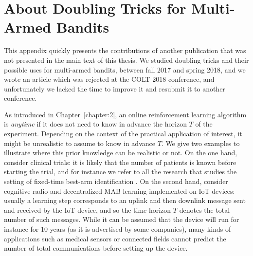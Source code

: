 \chapter{About Doubling Tricks for Multi-Armed Bandits}
\label{app:2:DoublingTricks}

This appendix quickly presents the contributions of another publication that was not presented in the main text of this thesis.
We studied doubling tricks and their possible uses for multi-armed bandits, between fall 2017 and spring 2018, and we wrote an article \cite{Besson2018DoublingTricks} which was rejected at the COLT 2018 conference, and unfortunately we lacked the time to improve it and resubmit it to another conference.




As introduced in Chapter~\ref{chapter:2},
an online reinforcement learning algorithm is \emph{anytime} if it does not need to know in advance the horizon $T$ of the experiment.
%
Depending on the context of the practical application of interest, it might be unrealistic to assume to know in advance $T$. We give two examples to illustrate where this prior knowledge can be realistic or not.
On the one hand, consider clinical trials: it is likely that the number of patients is known before starting the trial, and for instance we refer to all the research that studies the setting of fixed-time best-arm identification \cite{audibert2010best,Garivier16BAI}.
On the second hand, consider cognitive radio and decentralized MAB learning implemented on IoT devices: usually a learning step corresponds to an uplink and then downlink message sent and received by the IoT device, and so the time horizon $T$ denotes the total number of such messages. While it can be assumed that the device will run for instance for $10$ years (as it is advertised by some companies), many kinds of applications such as medical sensors or connected fields cannot predict the number of total communications before setting up the device.

